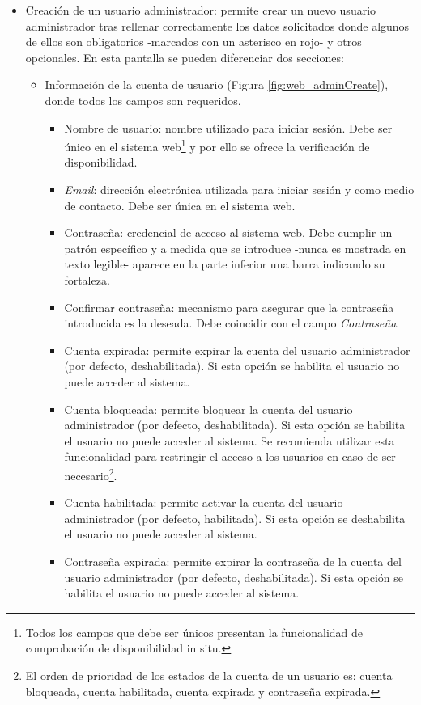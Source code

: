 \documentclass[12pt,a4paper, twoside]{report}
\begin{document}
\begin{itemize}
		\item Creación de un usuario administrador: permite crear un nuevo usuario administrador tras rellenar correctamente los datos solicitados donde algunos de ellos son obligatorios -marcados con un asterisco en rojo- y otros opcionales. En esta pantalla se pueden diferenciar dos secciones:
				
		\begin{itemize}
			\item Información de la cuenta de usuario (Figura \ref{fig:web_adminCreate}), donde todos los campos son requeridos.
		 
		 	\begin{itemize}
		 		\item Nombre de usuario: nombre utilizado para iniciar sesión. Debe ser único en el sistema web\footnote{Todos los campos que debe ser únicos presentan la funcionalidad de comprobación de disponibilidad in situ.} y por ello se ofrece la verificación de disponibilidad.
		 		\item \textit{Email}: dirección electrónica utilizada para iniciar sesión y como medio de contacto. Debe ser única en el sistema web.
		 		\item Contraseña: credencial de acceso al sistema web. Debe cumplir un patrón específico y a medida que se introduce -nunca es mostrada en texto legible- aparece en la parte inferior una barra indicando su fortaleza.
		 		\item Confirmar contraseña: mecanismo para asegurar que la contraseña introducida es la deseada. Debe coincidir con el campo \textit{Contraseña}.
		 		\item Cuenta expirada: permite expirar la cuenta del usuario administrador (por defecto, deshabilitada). Si esta opción se habilita el usuario no puede acceder al sistema.
		 		\item Cuenta bloqueada: permite bloquear la cuenta del usuario administrador (por defecto, deshabilitada). Si esta opción se habilita el usuario no puede acceder al sistema. Se recomienda utilizar esta funcionalidad para restringir el acceso a los usuarios en caso de ser necesario\footnote{El orden de prioridad de los estados de la cuenta de un usuario es: cuenta bloqueada, cuenta habilitada, cuenta expirada y contraseña expirada.}.
		 		\item Cuenta habilitada: permite activar la cuenta del usuario administrador (por defecto, habilitada). Si esta opción se deshabilita el usuario no puede acceder al sistema.
		 	 	\item Contraseña expirada: permite expirar la contraseña de la cuenta del usuario administrador (por defecto, deshabilitada). Si esta opción se habilita el usuario no puede acceder al sistema.
		 	\end{itemize}
			

\end{itemize}
\end{itemize}
\end{document}
